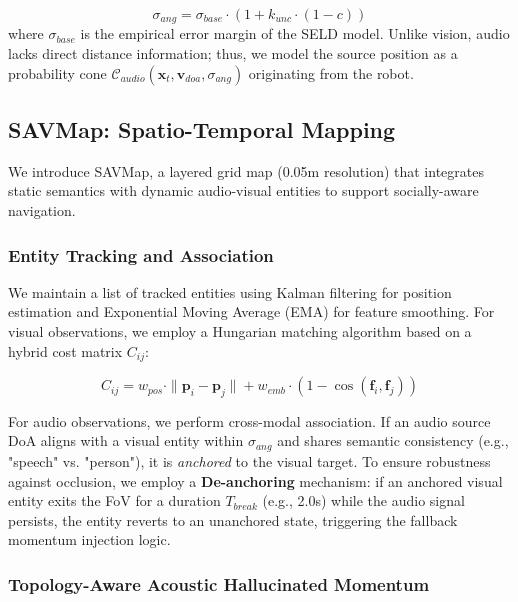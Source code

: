 \begin{equation}
    \sigma_{ang} = \sigma_{base} \cdot (1 + k_{unc} \cdot (1 - c))
    \label{eq:angular-uncertainty}
\end{equation}
where \(\sigma_{base}\) is the empirical error margin of the SELD model.
Unlike vision, audio lacks direct distance information; thus, we model
the source position as a probability cone
\(\mathcal{C}_{audio}(\mathbf{x}_t, \mathbf{v}_{doa}, \sigma_{ang})\)
originating from the robot.

\subsection{SAVMap: Spatio-Temporal
    Mapping}\label{savmap-spatio-temporal-mapping}

We introduce SAVMap, a layered grid map (0.05m resolution) that
integrates static semantics with dynamic audio-visual entities to
support socially-aware navigation.

\subsubsection{Entity Tracking and
    Association}\label{entity-tracking-and-association}

We maintain a list of tracked entities using Kalman filtering for position estimation and Exponential Moving Average (EMA) for feature smoothing. For visual observations, we
employ a Hungarian matching algorithm based on a hybrid cost matrix
\(C_{ij}\):

\begin{equation}
    C_{ij} = w_{pos} \cdot \|\mathbf{p}_i - \mathbf{p}_j\| + w_{emb} \cdot (1 - \cos(\mathbf{f}_i, \mathbf{f}_j))
    \label{eq:hungarian-cost}
\end{equation}

For audio observations, we perform cross-modal association. If an audio
source DoA aligns with a visual entity within \(\sigma_{ang}\) and shares semantic consistency
(e.g., "speech" vs. "person"), it is \textit{anchored} to the visual target.
To ensure robustness against occlusion, we employ a \textbf{De-anchoring} mechanism: if an anchored visual entity exits the FoV for a duration \(T_{break}\) (e.g., 2.0s) while the audio signal persists, the entity reverts to an unanchored state, triggering the fallback momentum injection logic.

\subsubsection{Topology-Aware Acoustic Hallucinated
    Momentum}\label{topology-aware-hallucinated-momentum}

